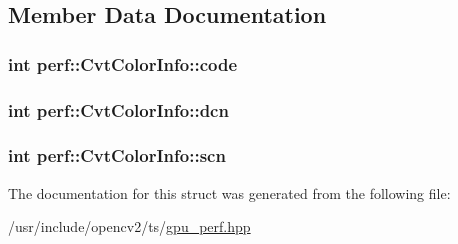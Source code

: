 \subsection{Member Data Documentation}
\hypertarget{structperf_1_1CvtColorInfo_a7afa952c16b394f6cff6debd044903c2}{
\subsubsection[{code}]{\setlength{\rightskip}{0pt plus 5cm}int perf\-::\-Cvt\-Color\-Info\-::code}}\label{structperf_1_1CvtColorInfo_a7afa952c16b394f6cff6debd044903c2}
\hypertarget{structperf_1_1CvtColorInfo_aa1a643279c1f154fc0281cbf5d137492}{
\subsubsection[{dcn}]{\setlength{\rightskip}{0pt plus 5cm}int perf\-::\-Cvt\-Color\-Info\-::dcn}}\label{structperf_1_1CvtColorInfo_aa1a643279c1f154fc0281cbf5d137492}
\hypertarget{structperf_1_1CvtColorInfo_a36ee9846b00d85e731275820b5b0f891}{
\subsubsection[{scn}]{\setlength{\rightskip}{0pt plus 5cm}int perf\-::\-Cvt\-Color\-Info\-::scn}}\label{structperf_1_1CvtColorInfo_a36ee9846b00d85e731275820b5b0f891}


The documentation for this struct was generated from the following file\-:\begin{DoxyCompactItemize}
\item 
/usr/include/opencv2/ts/\hyperlink{gpu__perf_8hpp}{gpu\-\_\-perf.\-hpp}\end{DoxyCompactItemize}
